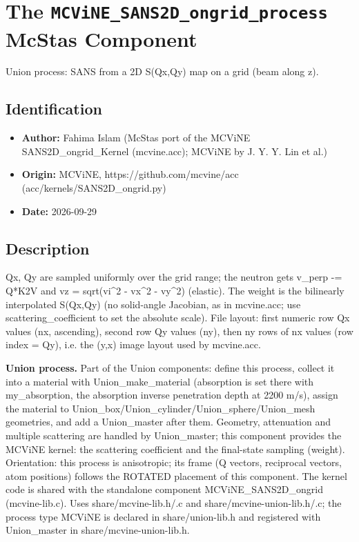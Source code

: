 \section{The \texttt{MCViNE\_SANS2D\_ongrid\_process} McStas Component}
Union process: SANS from a 2D S(Qx,Qy) map on a grid (beam along z).

\subsection*{Identification}
\begin{itemize}
  \item \textbf{Author:} Fahima Islam (McStas port of the MCViNE SANS2D\_ongrid\_Kernel (mcvine.acc); MCViNE by J. Y. Y. Lin et al.)
  \item \textbf{Origin:} MCViNE, https://github.com/mcvine/acc (acc/kernels/SANS2D\_ongrid.py)
  \item \textbf{Date:} 2026-09-29
\end{itemize}

\subsection*{Description}
Qx, Qy are sampled uniformly over the grid range; the neutron gets v\_perp -= Q*K2V and vz = sqrt(vi\textasciicircum{}2 - vx\textasciicircum{}2 - vy\textasciicircum{}2) (elastic). The weight is the bilinearly interpolated S(Qx,Qy) (no solid-angle Jacobian, as in mcvine.acc; use scattering\_coefficient to set the absolute scale). File layout: first numeric row Qx values (nx, ascending), second row Qy values (ny), then ny rows of nx values (row index = Qy), i.e. the (y,x) image layout used by mcvine.acc.

\textbf{Union process.} Part of the Union components: define this process, collect it into a material with Union\_make\_material (absorption is set there with my\_absorption, the absorption inverse penetration depth at 2200 m/s), assign the material to Union\_box/Union\_cylinder/Union\_sphere/Union\_mesh geometries, and add a Union\_master after them. Geometry, attenuation and multiple scattering are handled by Union\_master; this component provides the MCViNE kernel: the scattering coefficient and the final-state sampling (weight). Orientation: this process is anisotropic; its frame (Q vectors, reciprocal vectors, atom positions) follows the ROTATED placement of this component. The kernel code is shared with the standalone component MCViNE\_SANS2D\_ongrid (mcvine-lib.c). Uses share/mcvine-lib.h/.c and share/mcvine-union-lib.h/.c; the process type MCViNE is declared in share/union-lib.h and registered with Union\_master in share/mcvine-union-lib.h.

